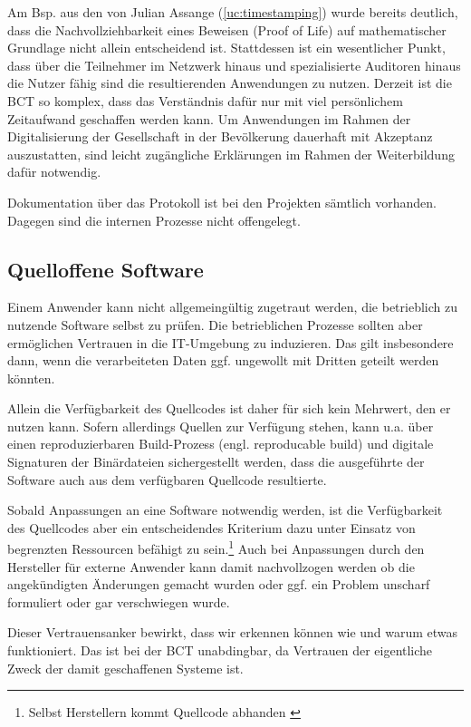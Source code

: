 Am Bsp. aus den  von Julian Assange (\ref{uc:timestamping}) wurde bereits deutlich, dass die Nachvollziehbarkeit eines Beweisen (Proof of Life) auf mathematischer Grundlage nicht allein entscheidend ist.
Stattdessen ist ein wesentlicher Punkt, dass über die Teilnehmer im Netzwerk hinaus und spezialisierte Auditoren hinaus die Nutzer fähig sind die resultierenden Anwendungen zu nutzen.
Derzeit ist die \gls{BCT} so komplex, dass das Verständnis dafür nur mit viel persönlichem Zeitaufwand geschaffen werden kann.
Um Anwendungen im Rahmen der Digitalisierung der Gesellschaft in der Bevölkerung dauerhaft mit Akzeptanz auszustatten, sind leicht zugängliche Erklärungen im Rahmen der Weiterbildung dafür notwendig.

Dokumentation über das Protokoll ist bei den Projekten sämtlich vorhanden.
Dagegen sind die internen Prozesse nicht offengelegt.

\subsection{Quelloffene Software}\label{krit:opensource}

Einem Anwender kann nicht allgemeingültig zugetraut werden, die betrieblich zu nutzende Software selbst zu prüfen. Die betrieblichen Prozesse sollten aber ermöglichen Vertrauen in die IT-Umgebung zu induzieren. Das gilt insbesondere dann, wenn die verarbeiteten Daten ggf. ungewollt mit Dritten geteilt werden könnten.

Allein die Verfügbarkeit des Quellcodes ist daher für sich kein Mehrwert, den er nutzen kann.
Sofern allerdings Quellen zur Verfügung stehen, kann u.a. über einen reproduzierbaren Build-Prozess (engl. reproducable build) und digitale Signaturen der Binärdateien sichergestellt werden, dass die ausgeführte der Software auch aus dem verfügbaren Quellcode resultierte.

Sobald Anpassungen an eine Software notwendig werden, ist die Verfügbarkeit des Quellcodes aber ein entscheidendes Kriterium dazu unter Einsatz von begrenzten Ressourcen befähigt zu sein.\footnote{Selbst Herstellern kommt Quellcode abhanden \autocite{w:ms-binpatch}}
Auch bei Anpassungen durch den Hersteller für externe Anwender kann damit nachvollzogen werden ob die angekündigten Änderungen gemacht wurden oder ggf. ein Problem unscharf formuliert oder gar verschwiegen wurde.

Dieser Vertrauensanker bewirkt, dass wir erkennen können wie und warum etwas funktioniert.
Das ist bei der \gls{BCT} unabdingbar, da Vertrauen der eigentliche Zweck der damit geschaffenen Systeme ist.

